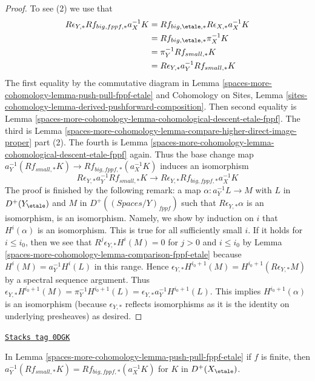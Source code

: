 \begin{proof}
\medskip\noindent
To see (2) we use that
\begin{align*}
R\epsilon_{Y, *}Rf_{big, fppf, *}a_X^{-1}K
& =
Rf_{big, \etale, *}R\epsilon_{X, *}a_X^{-1}K \\
& =
Rf_{big, \etale, *}\pi_X^{-1}K \\
& =
\pi_Y^{-1}Rf_{small, *}K \\
& =
R\epsilon_{Y, *} a_Y^{-1}Rf_{small, *}K
\end{align*}
The first equality by the commutative diagram in
Lemma \ref{spaces-more-cohomology-lemma-push-pull-fppf-etale}
and Cohomology on Sites, Lemma
\ref{sites-cohomology-lemma-derived-pushforward-composition}.
Then second equality is Lemma \ref{spaces-more-cohomology-lemma-cohomological-descent-etale-fppf}.
The third is
Lemma \ref{spaces-more-cohomology-lemma-compare-higher-direct-image-proper} part (2).
The fourth is Lemma \ref{spaces-more-cohomology-lemma-cohomological-descent-etale-fppf} again.
Thus the base change map
$a_Y^{-1}(Rf_{small, *}K) \to Rf_{big, fppf, *}(a_X^{-1}K)$
induces an isomorphism
$$
R\epsilon_{Y, *}a_Y^{-1}Rf_{small, *}K \to
R\epsilon_{Y, *}Rf_{big, fppf, *}a_X^{-1}K
$$
The proof is finished by the following remark: a map
$\alpha : a_Y^{-1}L \to M$ with $L$ in $D^+(Y_\etale)$
and $M$ in $D^+((\textit{Spaces}/Y)_{fppf})$ such that
$R\epsilon_{Y, *}\alpha$ is an isomorphism, is an isomorphism. Namely,
we show by induction on $i$ that $H^i(\alpha)$ is an isomorphism.
This is true for all sufficiently small $i$.
If it holds for $i \leq i_0$, then we see that
$R^j\epsilon_{Y, *}H^i(M) = 0$ for $j > 0$ and $i \leq i_0$
by Lemma \ref{spaces-more-cohomology-lemma-comparison-fppf-etale}
because $H^i(M) = a_Y^{-1}H^i(L)$ in this range.
Hence $\epsilon_{Y, *}H^{i_0 + 1}(M) = H^{i_0 + 1}(R\epsilon_{Y, *}M)$
by a spectral sequence argument.
Thus $\epsilon_{Y, *}H^{i_0 + 1}(M) = \pi_Y^{-1}H^{i_0 + 1}(L) =
\epsilon_{Y, *}a_Y^{-1}H^{i_0 + 1}(L)$.
This implies $H^{i_0 + 1}(\alpha)$ is an isomorphism
(because $\epsilon_{Y, *}$ reflects isomorphisms as it is the
identity on underlying presheaves) as desired.
\end{proof}

\begin{lemma}
\label{spaces-more-cohomology-lemma-finite-push-pull-fppf-etale}
\href{https://stacks.math.columbia.edu/tag/0DGK}{\texttt{Stacks tag 0DGK}}

In Lemma \ref{spaces-more-cohomology-lemma-push-pull-fppf-etale} if $f$ is finite, then
$a_Y^{-1}(Rf_{small, *}K) = Rf_{big, fppf, *}(a_X^{-1}K)$
for $K$ in $D^+(X_\etale)$.
\end{lemma}

